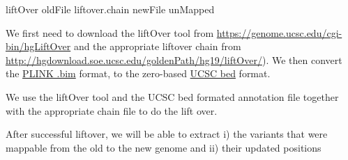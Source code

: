\documentclass[]{article}
\newenvironment{Shaded}{}{}
\newcommand{\KeywordTok}[1]{\textcolor[rgb]{0.00,0.44,0.13}{\textbf{#1}}}
\newcommand{\StringTok}[1]{\textcolor[rgb]{0.25,0.44,0.63}{#1}}
\newcommand{\CommentTok}[1]{\textcolor[rgb]{0.38,0.63,0.69}{\textit{#1}}}
\newcommand{\FunctionTok}[1]{\textcolor[rgb]{0.02,0.16,0.49}{#1}}
\newcommand{\VariableTok}[1]{\textcolor[rgb]{0.10,0.09,0.49}{#1}}
\newcommand{\OperatorTok}[1]{\textcolor[rgb]{0.40,0.40,0.40}{#1}}
\newcommand{\ExtensionTok}[1]{#1}
\newcommand{\NormalTok}[1]{#1}
\begin{document}
\begin{Shaded}
\begin{Highlighting}[]
\ExtensionTok{liftOver}\NormalTok{ oldFile liftover.chain newFile unMapped}
\end{Highlighting}
\end{Shaded}

We first need to download the liftOver tool from
\url{https://genome.ucsc.edu/cgi-bin/hgLiftOver} and the appropriate
liftover chain from
\url{http://hgdownload.soe.ucsc.edu/goldenPath/hg19/liftOver/}). We then
convert the
\href{https://www.cog-genomics.org/plink/1.9/formats\#bim}{PLINK .bim}
format, to the zero-based
\href{https://genome.ucsc.edu/FAQ/FAQformat.html\#format1}{UCSC bed}
format.

\begin{Shaded}
\end{Shaded}

We use the liftOver tool and the UCSC bed formated annotation file
together with the appropriate chain file to do the lift over.

\begin{Shaded}
\end{Shaded}

After successful liftover, we will be able to extract i) the variants
that were mappable from the old to the new genome and ii) their updated
positions

\begin{Shaded}
\end{Shaded}
\end{document}
